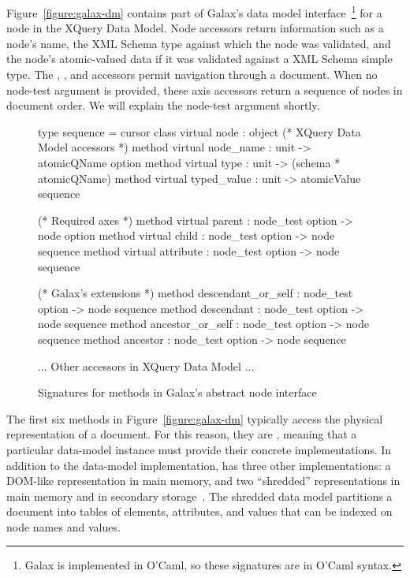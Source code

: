Figure~\ref{figure:galax-dm} contains part
of Galax's data model interface~\footnote{Galax is implemented in
O'Caml, so these signatures are in O'Caml syntax.} for a node in the
XQuery Data Model.  Node accessors return information such as a node's
name, the XML Schema type against which the node was validated, and
the node's atomic-valued data if it was validated against a XML
Schema simple type.  The , , and 
accessors permit navigation through a document.  When no node-test
argument is provided, these axis accessors return a sequence of nodes
in document order.  We will explain the node-test argument shortly. 
\begin{figure*}
\begin{small}
\begin{code}
type sequence = cursor
class virtual node : 
object
  (* XQuery Data Model accessors *)
  method virtual node_name   : unit -> atomicQName option
  method virtual type        : unit -> (schema * atomicQName)
  method virtual typed_value : unit -> atomicValue sequence

  (* Required axes *)
  method virtual parent      : node_test option -> node option
  method virtual child       : node_test option -> node sequence
  method virtual attribute   : node_test option -> node sequence

  (* Galax's extensions *)
  method descendant_or_self  : node_test option -> node sequence
  method descendant          : node_test option -> node sequence
  method ancestor_or_self    : node_test option -> node sequence
  method ancestor            : node_test option -> node sequence

  ... Other accessors in XQuery Data Model ...
\end{code}
\end{small}
\caption{Signatures for methods in Galax's abstract node interface}
\label{figure :galax-dm}
\end{figure*}

The first six methods in Figure~\ref{figure:galax-dm} typically access
the physical representation of a document.  For this reason, they are
, meaning that a particular data-model instance must
provide their concrete implementations.  In addition to the \padx{}
data-model implementation, \Galax{} has three other implementations: a
DOM-like representation in main memory, and two ``shredded''
representations in main memory and in secondary
storage~\cite{galax-ximep2004}.  The shredded data model partitions a
document into tables of elements, attributes, and values that can
be indexed on node names and values.

